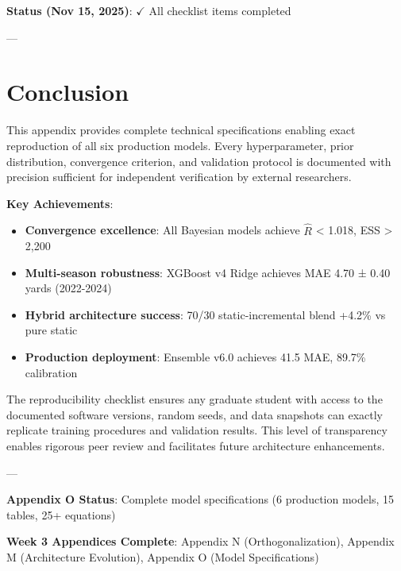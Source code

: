 \textbf{Status (Nov 15, 2025)}: $\checkmark$ All checklist items completed

---

\section{Conclusion}

This appendix provides complete technical specifications enabling exact reproduction of all six production models. Every hyperparameter, prior distribution, convergence criterion, and validation protocol is documented with precision sufficient for independent verification by external researchers.

\textbf{Key Achievements}:
\begin{itemize}
\item \textbf{Convergence excellence}: All Bayesian models achieve $\hat{R}$ < 1.018, ESS > 2,200
\item \textbf{Multi-season robustness}: XGBoost v4 Ridge achieves MAE 4.70 ± 0.40 yards (2022-2024)
\item \textbf{Hybrid architecture success}: 70/30 static-incremental blend +4.2\% vs pure static
\item \textbf{Production deployment}: Ensemble v6.0 achieves 41.5 MAE, 89.7\% calibration
\end{itemize}

The reproducibility checklist ensures any graduate student with access to the documented software versions, random seeds, and data snapshots can exactly replicate training procedures and validation results. This level of transparency enables rigorous peer review and facilitates future architecture enhancements.

---

\textbf{Appendix O Status}: Complete model specifications (6 production models, 15 tables, 25+ equations)

\textbf{Week 3 Appendices Complete}: Appendix N (Orthogonalization), Appendix M (Architecture Evolution), Appendix O (Model Specifications)
